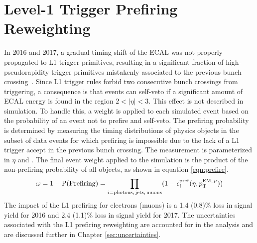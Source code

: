 \section{Level-1 Trigger Prefiring Reweighting}\label{sec:L1}
In 2016 and 2017, a gradual timing shift of the ECAL was not properly propagated to 
L1 trigger primitives, resulting in a significant fraction of high-pseudorapidity trigger primitives
mistakenly associated to the previous bunch crossing~\cite{L1_prefire}. 
Since L1 trigger rules forbid two consecutive bunch crossings from triggering, 
a consequence is that events can self-veto if a significant amount of ECAL energy is found in the region 
$2<|\eta|<3$. This effect is not described in simulation.
To handle this, a weight is applied to each simulated event based on the probability of an event not to prefire and self-veto. 
The prefiring probability is determined by measuring the timing distributions of physics objects in the subset of data events for which prefiring 
is impossible due to the lack of a L1 trigger accept in the previous bunch crossing. The measurement is parameterized in 
$\eta$ and \pt. The final event weight applied to the simulation is the product of the non-prefiring probability of all objects, as shown in equation \ref{eqn:prefire}.
\begin{equation}
	\omega = 1 - \mathrm{P(Prefiring)} = \prod_{i=\mathrm{photons,\,jets,\,muons}}(1-\epsilon_i^{\mathrm{pref}}(\eta,p_{\mathrm{T}}^{\mathrm{EM,\,\mu}}))
	\label{eqn:prefire}
\end{equation}
The impact of the L1 prefiring for electrons (muons) is a 1.4 (0.8)\% loss in signal yield for 2016 and 2.4 (1.1)\% loss in signal yield for 2017.
The uncertainties associated with the L1 prefiring reweighting are accounted for in the analysis and are discussed further in Chapter \ref{sec:uncertainties}.
